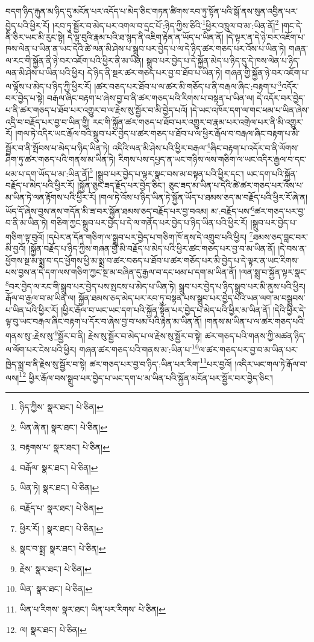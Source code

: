 བདག་ཉིད་རྐུན་མ་ཉིད་དུ་མངོན་པར་འདོད་པ་མེད་ཅིང་གཏན་ཚིགས་རབ་ཏུ་སྟོན་པའི་སྒོ་ནས་སུན་འབྱིན་པར་བྱེད་པའི་ཕྱིར་རོ། །རབ་ཏུ་སྦྱོར་བ་མེད་པར་འགལ་བ་དྲང་པོ་:ཉིད་ཀྱིས་ཅིའི་\footnote{ཉིད་ཀྱིས་  སྣར་ཐང་།  པེ་ཅིན། }ཕྱིར་འཁྲུལ་བ་མ་:ཡིན་ནོ།\footnote{ཡིན་ཞེ་ན།  སྣར་ཐང་།  པེ་ཅིན། } །གང་དེ་ནི་ཅིར་ཡང་མི་རུང་སྟེ། དེ་ལྟ་བུའི་རྣམ་པའི་ཐ་སྙད་ནི་འཇིག་རྟེན་ན་ཡོད་པ་ཡིན་ནོ། །དེ་ལྟར་ན་དེ་ཉེ་བར་འཇོག་པ་ཁས་ལེན་པ་ཡིན་ན་ཡང་དེའི་ཚེ་ལན་མི་ཤེས་པ་སྒྲུབ་པར་བྱེད་པ་ལ་དེ་ཉིད་ཚར་གཅད་པར་འོས་པ་ཡིན་ཏེ། གཞན་ལ་རང་གི་སྐྱོན་ནི་ཉེ་བར་འཇོག་པའི་ཕྱིར་ནི་མ་ཡིན། སྒྲུབ་པར་བྱེད་པ་དེ་སྐྱོན་མེད་པ་ཉིད་དུ་དེ་ཁས་ལེན་པ་ཉིད་ལན་མི་ཤེས་པ་ཡིན་པའི་ཕྱིར། དེ་ཉིད་ནི་སྔར་ཚར་གཅད་པར་བྱ་བ་ཐོབ་པ་ཡིན་ཏེ། གཞན་གྱི་སྐྱོན་ཉེ་བར་འཇོག་པ་ལ་ལྟོས་པ་མེད་པ་ཉིད་ཀྱི་ཕྱིར་རོ། །ཚར་བཅད་པར་ཐོབ་པ་ལ་ཚར་མི་གཅོད་པ་ནི་བརྒལ་ཞིང་:བརྟག་པ་\footnote{བརྟགས་པ་  སྣར་ཐང་།  པེ་ཅིན། }འདོར་བར་བྱེད་པ་སྟེ། བརྒལ་ཞིང་བརྟག་པ་ཞེས་བྱ་བ་ནི་ཚར་གཅད་པའི་རིགས་པ་བསྟན་པ་ཡིན་ལ། དེ་འདོར་བར་བྱེད་པ་ནི་ཚར་གཅད་པ་ཐོབ་པར་འགྱུར་བ་ལ་རྗེས་སུ་སྦྱོར་བ་མི་བྱེད་པའོ། །དེ་ཡང་འཁོར་དག་ལ་གང་ཕམ་པ་ཡིན་ཞེས་འདྲི་བ་བརྗོད་པར་བྱ་བ་ཡིན་གྱི། རང་གི་སྐྱོན་ཚར་གཅད་པ་ཐོབ་པར་འགྱུར་བ་རྣམ་པར་འགྲེལ་པར་ནི་མི་འགྱུར་རོ། །གལ་ཏེ་འདིར་ཡང་རྒོལ་བའི་སྒྲུབ་པར་བྱེད་པ་ཚར་གཅད་པ་ཐོབ་པ་ལ་ཕྱིར་རྒོལ་བ་བརྒལ་ཞིང་བརྟག་པ་མི་སྦྱོར་བ་ནི་སྤོབས་པ་མེད་པ་ཉིད་ཡིན་ཏེ། འདིའི་ལན་མི་ཤེས་པའི་ཕྱིར་བརྒལ་\footnote{བརྒོལ་  སྣར་ཐང་།  པེ་ཅིན། }ཞིང་བརྟག་པ་འདོར་བ་ནི་ལོགས་ཤིག་ཏུ་ཚར་གཅད་པའི་གནས་མ་ཡིན་ཏེ། རིགས་པས་དཔྱད་ན་ཡང་གཉིས་ལས་གཅིག་ལ་ཡང་འདིར་རྒྱལ་བ་དང་ཕམ་པ་དག་ཡོད་པ་མ་:ཡིན་ནོ།\footnote{ཡིན་ཏེ།  སྣར་ཐང་།  པེ་ཅིན། } །སྒྲུབ་པར་བྱེད་པ་ལྟར་སྣང་བས་མ་བསྟན་པའི་ཕྱིར་དང་། ཡང་དག་པའི་སྐྱོན་བརྗོད་པ་མེད་པའི་ཕྱིར་རོ། །སྐྱོན་ཅུང་ཟད་རྗོད་པར་བྱེད་ཅིང་། ཅུང་ཟད་མ་ཡིན་པ་དེའི་ཚེ་ཚར་གཅད་པར་འོས་པ་མ་ཡིན་ཏེ་ལན་རྟོགས་པའི་ཕྱིར་རོ། །གལ་ཏེ་འོས་པ་ཉིད་ཡིན་ཏེ་སྐྱོན་ཡོད་པ་ཐམས་ཅད་མ་བརྗོད་པའི་ཕྱིར་རོ་ཞེ་ན། ཡོད་དོ་ཞེས་བྱས་ནས་གདོན་མི་ཟ་བར་སྐྱོན་ཐམས་ཅད་བརྗོད་པར་བྱ་བའམ། མ་:བརྗོད་པས་\footnote{བརྗོད་པ་  སྣར་ཐང་།  པེ་ཅིན། }ཚར་གཅད་པར་བྱ་བ་ནི་མ་ཡིན་ཏེ། གཅིག་ཀྱང་སྒྲུབ་པར་བྱེད་པ་དེ་ལ་གནོད་པར་བྱེད་པ་ཉིད་ཡིན་པའི་ཕྱིར་རོ། །སྒྲུབ་པར་བྱེད་པ་གཅིག་ལྟ་བུའོ། །དཔེར་ན་དོན་གཅིག་ལ་སྒྲུབ་པར་བྱེད་པ་གཅིག་ཁོ་ནས་དེ་འགྲུབ་པའི་ཕྱིར། \footnote{ཕྱིར་རོ། །   སྣར་ཐང་།  པེ་ཅིན། }ཐམས་ཅད་བླང་བར་མི་བྱའོ། །སྐྱོན་བརྗོད་པ་ཉིད་ཀྱིས་གཞན་གྱི་མི་བརྗོད་པ་མེད་པའི་ཕྱིར་ཚང་གཅད་པར་བྱ་བ་མ་ཡིན་ནོ། །དེ་བས་ན་ཕྱོགས་སྔ་མ་སྨྲ་བ་དང་ཕྱོགས་ཕྱི་མ་སྨྲ་བ་ཚར་བཅད་པ་ཐོབ་པ་ཚར་གཅོད་པར་མི་བྱེད་པ་དེ་ལྟར་ན་ཡང་རིགས་པས་བྱས་ན་དེ་དག་ལས་གཅིག་ཀྱང་སྔ་མ་བཞིན་དུ་རྒྱལ་བ་དང་ཕམ་པ་དག་མ་ཡིན་ནོ། །ལན་སྨྲ་བ་སྐྱོན་ལྟར་སྣང་\footnote{སྣང་བ་སྨྲ་  སྣར་ཐང་།  པེ་ཅིན། }བར་བྱེད་ལ་རང་གི་སྒྲུབ་པར་བྱེད་པས་སྤངས་པ་མེད་པ་ཡིན་ཏེ། སྒྲུབ་པར་བྱེད་པ་ཉིད་སྒྲུབ་པར་མི་ནུས་པའི་ཕྱིར། རྒོལ་བ་རྒྱལ་བ་མ་ཡིན་ལ། སྐྱོན་ཐམས་ཅད་མེད་པར་རབ་ཏུ་བསྟན་པས་སྒྲུབ་པར་བྱེད་པའི་ཡན་ལག་མ་བསྒྲུབས་པ་ཡིན་པའི་ཕྱིར་རོ། །ཕྱིར་རྒོལ་བ་ཡང་ཡང་དག་པའི་སྐྱོན་སྟོན་པར་བྱེད་པ་མེད་པའི་ཕྱིར་མ་ཡིན་ནོ། །དེའི་ཕྱིར་དེ་ལྟ་བུ་ཡང་བརྒལ་ཞིང་བརྟག་པ་དོར་བ་ཞེས་བྱ་བ་ཕམ་པའི་རྟེན་མ་ཡིན་ནོ། །གནས་མ་ཡིན་པ་ལ་ཚར་གཅད་པའི་གནས་སུ་:རྗེས་སུ་\footnote{རྗེས་  སྣར་ཐང་།  པེ་ཅིན། }སྦྱོར་བ་ནི། རྗེས་སུ་སྦྱོར་བ་མེད་པ་ལ་རྗེས་སུ་སྦྱོར་བ་སྟེ། ཚར་གཅད་པའི་གནས་ཀྱི་མཚན་ཉིད་ལ་ལོག་པར་ངེས་པའི་ཕྱིར། གཞན་ཚར་གཅད་པའི་གནས་མ་:ཡིན་པ་\footnote{ཡིན་  སྣར་ཐང་།  པེ་ཅིན། }ལ་ཚར་གཅད་པར་བྱ་བ་མ་ཡིན་པར་ཁྱེད་སྨྲ་བ་ནི་རྗེས་སུ་སྦྱོར་བ་སྟེ། ཚར་གཅད་པར་བྱ་བ་ཉིད་:ཡིན་པར་རིག་\footnote{ཡིན་པ་རིགས་  སྣར་ཐང་། ཡིན་པར་རིགས་  པེ་ཅིན། }པར་བྱའོ། །འདིར་ཡང་གལ་ཏེ་རྒོལ་བ་ལས།\footnote{ལ།  སྣར་ཐང་།  པེ་ཅིན། } ཕྱིར་རྒོལ་བས་སྒྲུབ་པར་བྱེད་པ་ཡང་དག་པ་མ་ཡིན་པའི་སྐྱོན་མངོན་པར་སྦྱོར་བར་བྱེད་ཅིང་། 